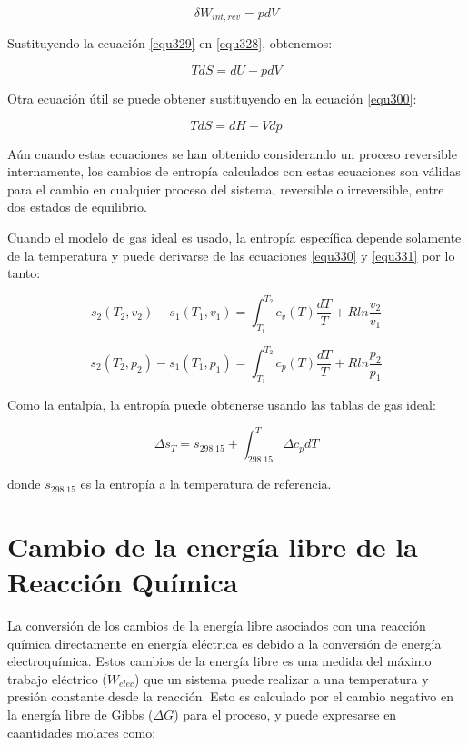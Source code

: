 \documentclass[12pt]{book}
\theoremstyle{definition}
\theoremstyle{remark}
\theoremstyle{plain}
\begin{document}
\begin{equation}
 \label{equ329}
\delta W_{int,rev}=p dV
\end{equation}

Sustituyendo la ecuación \ref{equ329} en \ref{equ328}, obtenemos:

\begin{equation}
 \label{equ330}
T d S = dU - p dV
\end{equation}

Otra ecuación útil se puede obtener sustituyendo en la ecuación \ref{equ300}:

\begin{equation}
 \label{equ331}
T d S = dH -V dp
\end{equation}

Aún cuando estas ecuaciones se han obtenido considerando un proceso reversible 
internamente, los cambios de entropía calculados con estas ecuaciones son válidas 
para el cambio en cualquier proceso del sistema, reversible o irreversible, entre
dos estados de equilibrio.

Cuando el modelo de gas ideal es usado, la entropía específica depende solamente de 
la temperatura y puede derivarse de las ecuaciones \ref{equ330} y \ref{equ331} por 
lo tanto:

\begin{equation}
 \label{equ332}
s_2(T_2, v_2) - s_1(T_1, v_1)=\int_{T_1}^{T_2} c_v(T) \frac{d T}{T}+R ln \frac{v_2}{v_1}
\end{equation}

\begin{equation}
 \label{equ333}
s_2(T_2, p_2) - s_1(T_1, p_1)=\int_{T_1}^{T_2} c_p(T) \frac{d T}{T}+R ln \frac{p_2}{p_1}
\end{equation}

Como la entalpía, la entropía puede obtenerse usando las tablas de gas ideal:

\begin{equation}
 \label{equ334}
\Delta s_{T} = s_{298.15}+\int_{298.15}^{T} \Delta c_p d T
\end{equation}

donde $s_{298.15}$ es la entropía a la temperatura de referencia.

\section{Cambio de la energía libre de la Reacción Química}

La conversión de los cambios de la energía libre asociados con una reacción química
directamente en energía eléctrica es debido a la conversión de energía electroquímica.
Estos cambios de la energía libre es una medida del máximo trabajo eléctrico ($W_{elec}$)
que un sistema puede realizar a una temperatura y presión constante desde la reacción. Esto
es calculado por el cambio negativo en la energía libre de Gibbs ($\Delta G$) para el
proceso, y puede expresarse en caantidades molares como:
\end{document}
